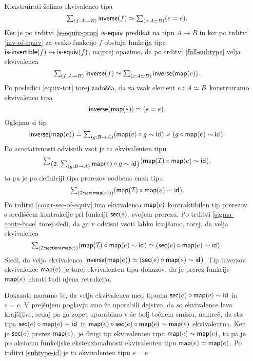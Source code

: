 \begin{dokaz}
  Konstruirati želimo ekvivalenco tipa
  \[\sumtype{f}{A \to B}{\isinv(f)} \simeq \sumtype{e}{A \simeq B}{(e = e)}.\]
  Ker je po trditvi \ref{is-equiv-prop} \(\isequiv\) predikat na tipu \(A \to B\) in ker po trditvi \ref{inv-of-equiv}
  za vsako funkcijo \(f\) obstaja funkcija tipa
  \(\typename{is-invertible}(f) \to \typename{is-equiv}(f)\), najprej opazimo, da po
  trditvi \ref{full-subtype} velja ekvivalenca
  \[\sumtype{f}{A \to B}{\isinv(f)} \simeq
    \sumtype{e}{A \simeq B}{\isinv(\map(e)).}
  \]
  Po posledici \ref{equiv-tot} torej zadošča, da za vsak element \(\dequiv{e}{A}{B}\) konstruiramo ekvivalenco tipa
  \[\isinv(\map(e)) \simeq (e = e).\]
  Oglejmo si tip
  \[\isinv(\map(e)) \doteq \sumtype{g}{B \to A}{(\map(e) \circ g \sim \id{}) \times (g \circ \map(e) \sim \id{})}.\]
  Po asociativnosti odvisnih vsot je ta ekvivalenten tipu
  \[\sumtype{\mathcal{I}}{\sumtype{g}{B \to A}{\map(e) \circ g \sim \id{}}}{(\map(\mathcal{I}) \circ \map(e) \sim \id{})},\]
  ta pa je po definiciji tipa prerezov sodbeno enak tipu
  \[\sumtype{\mathcal{I}}{\sect(\map(e))}{(\map(\mathcal{I}) \circ \map(e) \sim \id{})}.\]
  Po trditvi \ref{contr-sec-of-equiv} ima ekvivalenca \(\map(e)\) kontraktibilen tip prerezov s središčem kontrakcije pri funkciji \(\sect(e)\), svojem prerezu. Po trditvi \ref{sigma-contr-base} torej sledi, da ga v odvisni vsoti lahko krajšamo, torej, da velja ekvivalenca
  \[\sumtype{\mathcal{I}}{\typename{section}(\map e)}{(\map(\mathcal{I}) \circ \map(e) \sim \id{})} \simeq
    \left(\sect(e) \circ \map(e) \sim \id{}\right).\]
  Sledi, da velja ekvivalenca \(\isinv(\map (e)) \simeq (\sect(e) \circ \map(e) \sim \id{})\). Tip inverzov ekvivalence \(\map(e)\) je torej ekvivalenten tipu dokazov, da je prerez funkcije \(\map(e)\) hkrati tudi njena retrakcija.

  Dokazati moramo še, da velja ekvivalenca med tipoma \(\sect(e) \circ \map(e) \sim \id{}\) in \(e = e\). V prejšnjem poglavju smo že uporabili dejstvo, da so ekvivalence levo krajšljive, sedaj pa ga zopet uporabimo v še bolj točnem smislu, namreč, da sta tipa \(\sect(e) \circ \map(e) \sim \id{}\) in \(\map(e) \circ \sect(e) \circ \map(e) \sim \map(e)\) ekvivalentna. Ker je \(\sect(e)\) prerez \(\map(e)\), je drugi tip ekvivalenten tipu \(\map(e) \sim \map(e)\), ta pa je po aksiomu funkcijske ekstenzionalnosti ekvivalenten tipu \(\map(e) = \map(e)\). Po trditvi \ref{subtype-id} je ta ekvivalenten tipu \(e = e\).
\end{dokaz}

